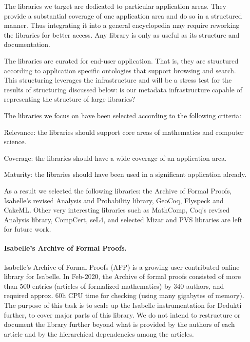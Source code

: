 The libraries we target are dedicated to particular application
areas. They provide a substantial coverage of one application area
and do so in a structured manner. Thus integrating it into a general encyclopedia
may require reworking the libraries for better access. Any library
is only as useful as its structure and documentation.

The libraries are curated for end-user application. That is, they are
structured according to application specific ontologies that support
browsing and search. This structuring leverages the infrastructure
and will be a stress test for the results of structuring discussed
below: is our metadata infrastructure capable of representing the
structure of large libraries?

The libraries we focus on have been selected according to the
following criteria:
\begin{compactitem}
\item Relevance: the libraries should support core areas of mathematics
  and computer science.
\item Coverage: the libraries should have a wide coverage of an
  application area.
\item Maturity: the libraries should have been used in a significant
  application already.
\end{compactitem}

As a result we selected the following libraries: the Archive of Formal
Proofs, Isabelle's revised Analysis and Probability library, GeoCoq,
Flyspeck and CakeML.  Other very interesting libraries such as
MathComp, Coq's revised Analysis library, CompCert, seL4, and selected
Mizar and PVS libraries are left for future work.

\paragraph*{Isabelle's Archive of Formal Proofs.}
Isabelle's Archive of Formal Proofs (AFP) \cite{isabelle-afp} is a
growing user-contributed online library for Isabelle. In Feb-2020, the
Archive of formal proofs consisted of more than 500 entries (articles of formalized
mathematics) by 340 authors, and required approx. 60h CPU time for
checking (using many gigabytes of memory).  The purpose of this task
is to scale up the Isabelle instrumentation for Dedukti further, to
cover major parts of this library. We do not intend to restructure or
document the library further beyond what is provided by the authors of
each article and by the hierarchical dependencies among the articles.

